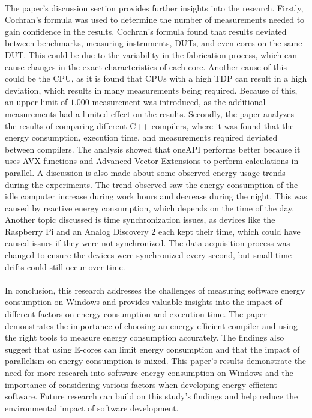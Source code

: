 \paragraph*{}
The paper's discussion section provides further insights into the research. Firstly, Cochran's formula was used to determine the number of measurements needed to gain confidence in the results. Cochran's formula found that results deviated between benchmarks, measuring instruments, DUTs, and even cores on the same DUT. This could be due to the variability in the fabrication process, which can cause changes in the exact characteristics of each core. Another cause of this could be the CPU, as it is found that CPUs with a high TDP can result in a high deviation, which results in many measurements being required. Because of this, an upper limit of $1.000$ measurement was introduced, as the additional measurements had a limited effect on the results. Secondly, the paper analyzes the results of comparing different C++ compilers, where it was found that the energy consumption, execution time, and measurements required deviated between compilers. The analysis showed that oneAPI performs better because it uses AVX functions and Advanced Vector Extensions to perform calculations in parallel. A discussion is also made about some observed energy usage trends during the experiments. The trend observed saw the energy consumption of the idle computer increase during work hours and decrease during the night. This was caused by reactive energy consumption, which depends on the time of the day. Another topic discussed is time synchronization issues, as devices like the Raspberry Pi and an Analog Discovery 2 each kept their time, which could have caused issues if they were not synchronized. The data acquisition process was changed to ensure the devices were synchronized every second, but small time drifts could still occur over time.

\paragraph*{}
In conclusion, this research addresses the challenges of measuring software energy consumption on Windows and provides valuable insights into the impact of different factors on energy consumption and execution time. The paper demonstrates the importance of choosing an energy-efficient compiler and using the right tools to measure energy consumption accurately. The findings also suggest that using E-cores can limit energy consumption and that the impact of parallelism on energy consumption is mixed. This paper's results demonstrate the need for more research into software energy consumption on Windows and the importance of considering various factors when developing energy-efficient software. Future research can build on this study's findings and help reduce the environmental impact of software development. 

